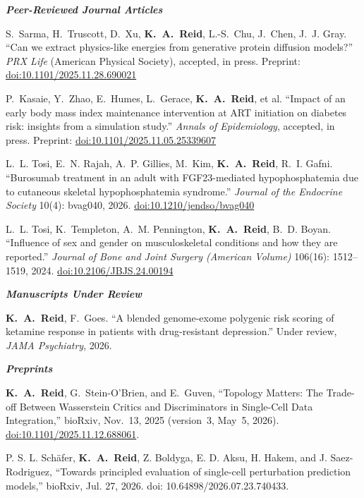 \documentclass[letterpaper,11pt]{article}
\newcommand{\me}{\textbf{K.~A.~Reid}}
\newcommand{\subhead}[1]{\needspace{3\baselineskip}\vspace{3pt}\textit{\textbf{#1}}\par\vspace{-2pt}}
\begin{document}
\subhead{Peer-Reviewed Journal Articles}
\begin{pubs}
\item S.~Sarma, H.~Truscott, D.~Xu, \me, L.-S.~Chu, J.~Chen, J.~J. Gray.
      ``Can we extract physics-like energies from generative protein diffusion models?''
      \emph{PRX Life} (American Physical Society), accepted, in press.
      Preprint: \href{https://doi.org/10.1101/2025.11.28.690021}{doi:10.1101/2025.11.28.690021}

\item P.~Kasaie, Y.~Zhao, E.~Humes, L.~Gerace, \me, et al.
      ``Impact of an early body mass index maintenance intervention at ART initiation on diabetes
      risk: insights from a simulation study.'' \emph{Annals of Epidemiology}, accepted, in press.
      Preprint: \href{https://doi.org/10.1101/2025.11.05.25339607}{doi:10.1101/2025.11.05.25339607}

\item L.~L. Tosi, E.~N. Rajah, A.~P. Gillies, M.~Kim, \me, R.~I. Gafni.
      ``Burosumab treatment in an adult with FGF23-mediated hypophosphatemia due to cutaneous
      skeletal hypophosphatemia syndrome.''
      \emph{Journal of the Endocrine Society} 10(4): bvag040, 2026.
      \href{https://doi.org/10.1210/jendso/bvag040}{doi:10.1210/jendso/bvag040}

\item L.~L. Tosi, K.~Templeton, A.~M. Pennington, \me, B.~D. Boyan.
      ``Influence of sex and gender on musculoskeletal conditions and how they are reported.''
      \emph{Journal of Bone and Joint Surgery (American Volume)} 106(16): 1512--1519, 2024.
      \href{https://doi.org/10.2106/JBJS.24.00194}{doi:10.2106/JBJS.24.00194}
\end{pubs}

\subhead{Manuscripts Under Review}
\begin{pubs}
\item \me, F.~Goes.
      ``A blended genome-exome polygenic risk scoring of ketamine response in patients with
      drug-resistant depression.'' Under review, \emph{JAMA Psychiatry}, 2026.
\end{pubs}

\subhead{Preprints}
\begin{pubs}
    \item \me, G.~Stein-O'Brien, and E.~Guven, ``Topology Matters: The Trade-off Between Wasserstein Critics and Discriminators in Single-Cell Data Integration,'' bioRxiv, Nov.~13, 2025 (version~3, May~5, 2026). \href{https://doi.org/10.1101/2025.11.12.688061}{doi:10.1101/2025.11.12.688061}.

    \item P. S. L. Schäfer, \me, Z. Boldyga, E. D. Aksu, H. Hakem, and J. Saez-Rodriguez, “Towards principled evaluation of single-cell perturbation prediction models,” bioRxiv, Jul. 27, 2026. doi: 10.64898/2026.07.23.740433.
\end{pubs}
\end{document}
